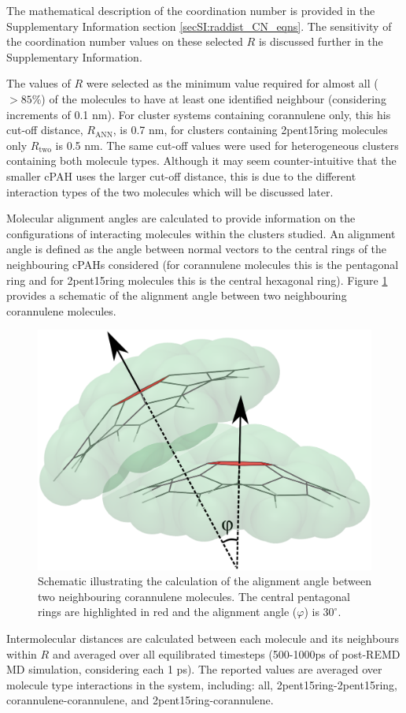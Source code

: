 The mathematical description of the coordination number is provided in the Supplementary Information section \ref{secSI:raddist_CN_eqns}.
The sensitivity of the coordination number values on these selected $R$ is discussed further in the Supplementary Information.

The values of $R$ were selected as the minimum value required for almost all ($>85\%$) of the molecules to have at least one identified neighbour (considering increments of 0.1 nm).  For cluster systems containing corannulene only, this his cut-off distance, $R_{\text{ANN}}$, is 0.7 nm, for clusters containing 2pent15ring molecules only $R_{\text{two}}$ is 0.5 nm. The same cut-off values were used for heterogeneous clusters containing both molecule types.
Although it may seem counter-intuitive that the smaller cPAH uses the larger cut-off distance, this is due to the different interaction types of the two molecules which will be discussed later.

Molecular alignment angles are calculated to provide information on the configurations of interacting molecules within the clusters studied.  An alignment angle is defined as the angle between normal vectors to the central rings of the neighbouring cPAHs considered (for corannulene molecules this is the pentagonal ring and for 2pent15ring molecules this is the central hexagonal ring).  Figure \ref{fig:alignmentangle_schematic} provides a schematic of the alignment angle between two neighbouring corannulene molecules.
%
\begin{figure}[!tbh]
\centering
\includegraphics[width=0.25\linewidth]{Figures/alignment_angle_schematic.eps}
\caption{Schematic illustrating the calculation of the alignment angle between two neighbouring corannulene molecules. The central pentagonal rings are highlighted in red and the alignment angle ($\varphi$) is $30^{\circ}$.}
\label{fig:alignmentangle_schematic}
\end{figure}
 
Intermolecular distances are calculated between each molecule and its neighbours within $R$ and averaged over all equilibrated timesteps (500-1000ps of post-REMD MD simulation, considering each 1 ps).  The reported values are averaged over molecule type interactions in the system, including: all, 2pent15ring-2pent15ring, corannulene-corannulene, and 2pent15ring-corannulene.

